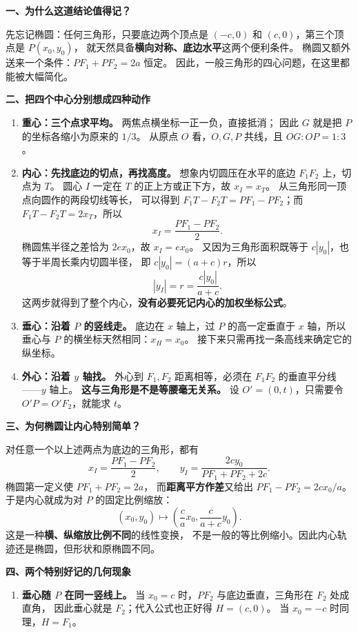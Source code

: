 \begin{explanationbox}
\textbf{一、为什么这道结论值得记？}

先忘记椭圆：任何三角形，只要底边两个顶点是
$(-c,0)$ 和 $(c,0)$，第三个顶点是 $P(x_0,y_0)$，
就天然具备\textbf{横向对称、底边水平}这两个便利条件。
椭圆又额外送来一个条件：$PF_1+PF_2=2a$ 恒定。
因此，一般三角形的四心问题，在这里都能被大幅简化。

\textbf{二、把四个中心分别想成四种动作}
\begin{enumerate}
 \item \textbf{重心：三个点求平均。} 两焦点横坐标一正一负，直接抵消；
 因此 $G$ 就是把 $P$ 的坐标各缩小为原来的 $1/3$。
 从原点 $O$ 看，$O,G,P$ 共线，且 $OG:OP=1:3$。

 \item \textbf{内心：先找底边的切点，再找高度。}
 想象内切圆压在水平的底边 $F_1F_2$ 上，切点为 $T$。
 圆心 $I$ 一定在 $T$ 的正上方或正下方，故 $x_I=x_T$。
 从三角形同一顶点向圆作的两段切线等长，
 可以得到 $F_1T-F_2T=PF_1-PF_2$；而
 $F_1T-F_2T=2x_T$，所以
 \[
 x_I=\frac{PF_1-PF_2}{2}.
 \]
 椭圆焦半径之差恰为 $2ex_0$，故 $x_I=ex_0$。
 又因为三角形面积既等于 $c|y_0|$，也等于半周长乘内切圆半径，
 即 $c|y_0|=(a+c)r$，所以
 \[
 |y_I|=r=\frac{c|y_0|}{a+c}.
 \]
 这两步就得到了整个内心，\textbf{没有必要死记内心的加权坐标公式}。

 \item \textbf{垂心：沿着 $P$ 的竖线走。}
 底边在 $x$ 轴上，过 $P$ 的高一定垂直于 $x$ 轴，所以垂心与 $P$
 的横坐标天然相同：$x_H=x_0$。
 接下来只需再找一条高线来确定它的纵坐标。

 \item \textbf{外心：沿着 $y$ 轴找。}
 外心到 $F_1,F_2$ 距离相等，必须在 $F_1F_2$ 的垂直平分线——$y$ 轴上。
 \textbf{这与三角形是不是等腰毫无关系。}
 设 $O'=(0,t)$，只需要令 $O'P=O'F_2$，就能求 $t$。
\end{enumerate}

\textbf{三、为何椭圆让内心特别简单？}

对任意一个以上述两点为底边的三角形，都有
\[
 x_I=\frac{PF_1-PF_2}{2},\qquad
 y_I=\frac{2cy_0}{PF_1+PF_2+2c}.
\]
椭圆第一定义使 $PF_1+PF_2=2a$，
而\textbf{距离平方作差}又给出 $PF_1-PF_2=2cx_0/a$。
于是内心就成为对 $P$ 的固定比例缩放：
\[
 (x_0,y_0)\longmapsto
 \left(\frac ca x_0,\frac{c}{a+c}y_0\right).
\]
这是一种\textbf{横、纵缩放比例不同}的线性变换，
不是一般的等比例缩小。因此内心轨迹还是椭圆，但形状和原椭圆不同。

\textbf{四、两个特别好记的几何现象}
\begin{enumerate}
 \item \textbf{垂心随 $P$ 在同一竖线上。}
 当 $x_0=c$ 时，$PF_2$ 与底边垂直，三角形在 $F_2$ 处成直角，
 因此垂心就是 $F_2$；代入公式也正好得 $H=(c,0)$。
 当 $x_0=-c$ 时同理，$H=F_1$。


\end{enumerate}
\end{explanationbox}
